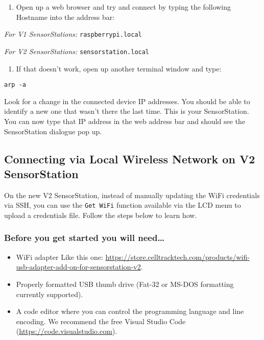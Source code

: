 \documentclass[
]{article}
\providecommand{\tightlist}{%
  \setlength{\itemsep}{0pt}\setlength{\parskip}{0pt}}
\begin{document}
\begin{enumerate}
\def\labelenumi{\arabic{enumi}.}
\setcounter{enumi}{13}
\tightlist
\item
  Open up a web browser and try and connect by typing the following
  Hostname into the address bar:
\end{enumerate}

\emph{For V1 SensorStations:} \texttt{raspberrypi.local}

\emph{For V2 SensorStations:} \texttt{sensorstation.local}

\begin{enumerate}
\def\labelenumi{\arabic{enumi}.}
\setcounter{enumi}{14}
\tightlist
\item
  If that doesn't work, open up another terminal window and type:
\end{enumerate}

\texttt{arp\ -a}

Look for a change in the connected device IP addresses. You should be
able to identify a new one that wasn't there the last time. This is your
SensorStation. You can now type that IP address in the web address bar
and should see the SensorStation dialogue pop up.

\hypertarget{connecting-via-local-wireless-network-on-v2-sensorstation}{%
\subsection{\texorpdfstring{Connecting via Local Wireless Network on
\textbf{V2
SensorStation}}{Connecting via Local Wireless Network on V2 SensorStation}}\label{connecting-via-local-wireless-network-on-v2-sensorstation}}

On the new V2 SensorStation, instead of manually updating the WiFi
credentials via SSH, you can use the \texttt{Get\ WiFi} function
available via the LCD menu to upload a credentials file. Follow the
steps below to learn how.

\hypertarget{before-you-get-started-you-will-need-2}{%
\subsubsection{Before you get started you will
need\ldots{}}\label{before-you-get-started-you-will-need-2}}

\begin{itemize}
\tightlist
\item
  WiFi adapter Like this one:
  \url{https://store.celltracktech.com/products/wifi-usb-adapter-add-on-for-sensorstation-v2}.
\item
  Properly formatted USB thumb drive (Fat-32 or MS-DOS formatting
  currently supported).
\item
  A code editor where you can control the programming language and line
  encoding. We recommend the free Visual Studio Code
  (\url{https://code.visualstudio.com}).
\end{itemize}
\end{document}
